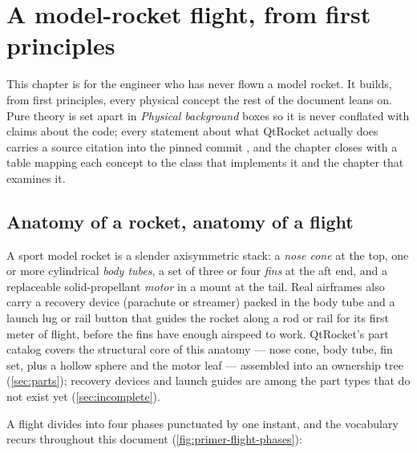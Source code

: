 \section{A model-rocket flight, from first principles}\label{sec:primer}

This chapter is for the engineer who has never flown a model rocket. It builds, from first
principles, every physical concept the rest of the document leans on. Pure theory is set
apart in \emph{Physical background} boxes so it is never conflated with claims about the
code; every statement about what QtRocket actually does carries a source citation into the
pinned commit , and the chapter closes with a table mapping each concept to
the class that implements it and the chapter that examines it.

\subsection{Anatomy of a rocket, anatomy of a flight}\label{sec:primer-anatomy}

A sport model rocket is a slender axisymmetric stack: a \emph{nose cone} at the top, one or
more cylindrical \emph{body tubes}, a set of three or four \emph{fins} at the aft end, and a
replaceable solid-propellant \emph{motor} in a mount at the tail. Real airframes also carry a
recovery device (parachute or streamer) packed in the body tube and a launch lug or rail
button that guides the rocket along a rod or rail for its first meter of flight, before the
fins have enough airspeed to work. QtRocket's part catalog covers the structural core of this anatomy
--- nose cone, body tube, fin set, plus a hollow sphere and the motor leaf --- assembled
into an ownership tree (\cref{sec:parts}); recovery devices and launch guides are among the
part types that do not exist yet (\cref{sec:incomplete}).

A flight divides into four phases punctuated by one instant, and the vocabulary recurs
throughout this document (\cref{fig:primer-flight-phases}):

